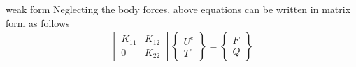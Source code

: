 \documentclass{beamer}
\begin{document}
\begin{frame}[t,fragile]{weak form}
    Neglecting the body forces, above equations can be written in matrix form as follows\\ 
    \begin{align*}
\begin{bmatrix}
    K_{11} & K_{12} \\
    0 & K_{22}
\end{bmatrix}
\begin{Bmatrix}
    U^e\\ T^e
\end{Bmatrix}=
\begin{Bmatrix}
    F\\ Q
\end{Bmatrix}
\end{align*} 
 

\end{frame}
\end{document}
